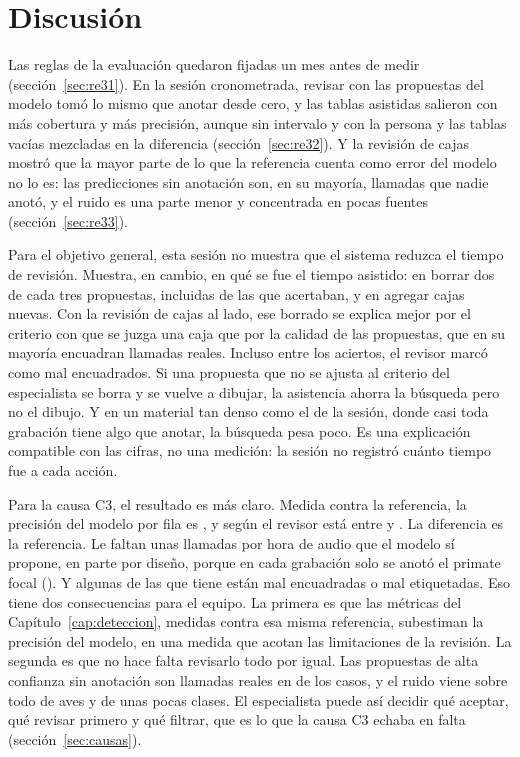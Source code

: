 \section{Discusión}
\label{sec:discusion-oe3}

 Las reglas de la evaluación quedaron fijadas un mes antes de
medir (sección~\ref{sec:re31}). En la sesión cronometrada, revisar con las
propuestas del modelo tomó lo mismo que anotar desde cero, y las tablas
asistidas salieron con más cobertura y más precisión, aunque sin intervalo y con
la persona y las tablas vacías mezcladas en la diferencia
(sección~\ref{sec:re32}). Y la revisión de cajas mostró
que la mayor parte de lo que la referencia cuenta como error del modelo no lo es:
las predicciones sin anotación son, en su mayoría, llamadas que nadie anotó, y el
ruido es una parte menor y concentrada en pocas fuentes (sección~\ref{sec:re33}).

 Para el objetivo general, esta sesión no muestra que el
sistema reduzca el tiempo de revisión. Muestra, en cambio, en qué se fue el tiempo
asistido: en borrar dos de cada tres propuestas, incluidas \uProposalsHitDeleted{}
de las \uProposalsHit{} que acertaban, y en agregar cajas nuevas. Con la revisión
de cajas al lado, ese borrado se explica mejor por el criterio con que se juzga una
caja que por la calidad de las propuestas, que en su mayoría encuadran llamadas
reales. Incluso entre los aciertos, el revisor marcó \uControlsFraming{} como mal
encuadrados. Si una propuesta que no se ajusta al criterio del especialista se
borra y se vuelve a dibujar, la asistencia ahorra la búsqueda pero no el dibujo. Y
en un material tan denso como el de la sesión, donde casi toda grabación tiene
algo que anotar, la búsqueda pesa poco. Es una explicación compatible con las
cifras, no una medición: la sesión no registró cuánto tiempo fue a cada acción.

Para la causa C3, el resultado es más claro. Medida contra la referencia, la
precisión del modelo por fila es \uPrecisionRef{}, y según el revisor está entre
\uPrecisionStrict{} y \uPrecisionLenient{}. La diferencia es la referencia. Le
faltan unas \uUnannotatedPerHour{} llamadas por hora de audio que el modelo sí
propone, en parte por diseño, porque en cada grabación solo se anotó el primate
focal (\cpEquipo). Y algunas de las que tiene están mal encuadradas o mal
etiquetadas. Eso tiene dos consecuencias para el equipo. La primera es que las
métricas del Capítulo~\ref{cap:deteccion}, medidas contra esa misma referencia,
subestiman la precisión del modelo, en una medida que acotan las limitaciones de
la revisión. La segunda es que no hace falta revisarlo todo por igual.
Las propuestas de alta confianza sin anotación son llamadas reales en
\uNoneRealTop{} de los casos, y el ruido viene sobre todo de aves y de unas pocas
clases. El especialista puede así decidir qué aceptar, qué revisar primero y qué
filtrar, que es lo que la causa C3 echaba en falta (sección~\ref{sec:causas}).

